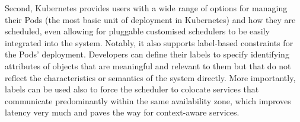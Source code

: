 Second, Kubernetes provides users with a wide range of options for managing their Pods (the most basic unit of deployment in Kubernetes) and how they are scheduled, even allowing for pluggable customised schedulers to be easily integrated into the system. Notably, it also supports label-based constraints for the Pods' deployment. Developers can define their labels to specify identifying attributes of objects that are meaningful and relevant to them but that do not reflect the characteristics or semantics of the system directly. 
More importantly, labels can be used also to force the scheduler to colocate services that communicate predominantly within the same availability zone, which improves latency very much and paves the way for context-aware services. %




